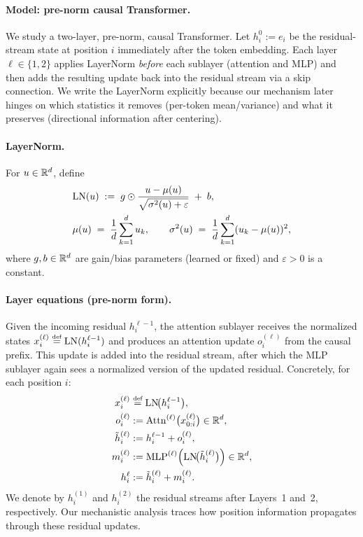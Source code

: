 \documentclass{article}
\theoremstyle{plain}
\theoremstyle{definition}
\theoremstyle{remark}
\begin{document}
\paragraph{Model: pre-norm causal Transformer.}
We study a two-layer, pre-norm, causal Transformer.
Let $h_i^{0} := e_i$ be the residual-stream state at position $i$ immediately after the token embedding.
Each layer $\ell\in\{1,2\}$ applies LayerNorm \emph{before} each sublayer (attention and MLP) and then adds the resulting update back
into the residual stream via a skip connection. We write the LayerNorm explicitly because our mechanism later hinges on which statistics
it removes (per-token mean/variance) and what it preserves (directional information after centering).

\paragraph{LayerNorm.}
For $u\in\mathbb{R}^d$, define
\begin{align}
&\mathrm{LN}(u) \;:=\; g \odot \frac{u - \mu(u)}{\sqrt{\sigma^2(u)+\varepsilon}} \;+\; b, \\
&\mu(u) \;=\;\frac{1}{d}\sum_{k=1}^d u_k,\qquad
\sigma^2(u)\;=\;\frac{1}{d}\sum_{k=1}^d (u_k-\mu(u))^2,
\end{align}
where $g,b\in\mathbb{R}^d$ are gain/bias parameters (learned or fixed) and $\varepsilon>0$ is a constant.

\paragraph{Layer equations (pre-norm form).}
Given the incoming residual $h_i^{\ell-1}$, the attention sublayer receives the normalized states
$x_i^{(\ell)} \defeq \LN(h_i^{\ell-1})$ and produces an attention update $o_i^{(\ell)}$ from the causal prefix.
This update is added into the residual stream, after which the MLP sublayer again sees a normalized version of the updated residual.
Concretely, for each position $i$:
\begin{align}
x_i^{(\ell)} &\defeq \LN\!\big(h_i^{\ell-1}\big), \label{eq:first_layer_norm} \\
o_i^{(\ell)} &:= \Attn^{(\ell)}\!\big(x_{0:i}^{(\ell)}\big)\in\R^d, \\
\tilde h_i^{(\ell)} &:= h_i^{\ell-1} + o_i^{(\ell)}, \\
m_i^{(\ell)} &:= \MLP^{(\ell)}\!\Big(\LN\!\big(\tilde h_i^{(\ell)}\big)\Big)\in\R^d, \\
h_i^{\ell} &:= \tilde h_i^{(\ell)} + m_i^{(\ell)}.
\end{align}
We denote by $h_i^{(1)}$ and $h_i^{(2)}$ the residual streams after Layers~1 and~2, respectively.
Our mechanistic analysis traces how position information propagates through these residual updates.
\end{document}
